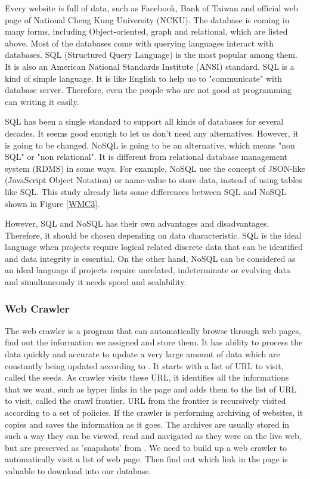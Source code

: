 Every website is full of data, such as Facebook, Bank of Taiwan and official web page of National Cheng Kung University (NCKU).
The database is coming in many forms, including Object-oriented, graph and relational, which are listed above.
Most of the databases come with querying languages interact with databases.
SQL (Structured Query Language) is the most popular among them.
It is also an American National Standards Institute (ANSI) standard.
SQL is a kind of simple language.
It is like English to help uo to "communicate" with database server.
Therefore, even the people who are not good at programming can writing it easily.

SQL has been a single standard to support all kinds of databases for several decades.
It seems good enough to let us don't need any alternatives.
However, it is going to be changed.
NoSQL is going to be an alternative, which means "non SQL" or "non relational".
It is different from relational database management system (RDMS) in some ways.
For example, NoSQL use the concept of JSON-like (JavaScript Object Notation) or name-value to store data, instead of using tables like SQL.
This study already lists some differences between SQL and NoSQL shown in Figure \ref{WMC3}.

However, SQL and NoSQL has their own advantages and disadvantages.
Therefore, it should be chosen depending on data characteristic.
SQL is the ideal language when projects require logical related discrete data that can be identified and data integrity is essential.
On the other hand, NoSQL can be considered as an ideal language if projects require unrelated, indeterminate or evolving data and simultaneously it needs speed and scalability.
	
\subsubsection{Web Crawler}
The web crawler is a program that can automatically browse through web pages, find out the information we assigned and store them.
It has ability to process the data quickly and accurate to update a very large amount of data which are constantly being updated according to \cite{Liu2012}.
It starts with a list of URL to visit, called the seeds.
As crawler visits these URL, it identifies all the informations that we want, such as hyper links in the page and adds them to the list of URL to visit, called the crawl frontier.
URL from the frontier is recursively visited according to a set of policies.
If the crawler is performing archiving of websites, it copies and saves the information as it goes.
The archives are usually stored in such a way they can be viewed, read and navigated as they were on the live web, but are preserved as 'snapshots' from \cite{Du2013}.
We need to build up a web crawler to automatically visit a list of web page.
Then find out which link in the page is valuable to download into our database.

